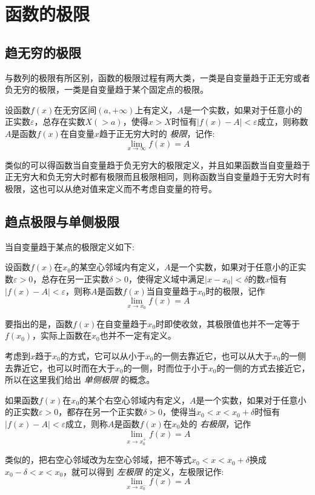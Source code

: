 
\section{函数的极限}
\label{sec:limit-of-function}

\subsection{趋无穷的极限}
\label{sec:limit-of-function-at-infinite-point}

与数列的极限有所区别，函数的极限过程有两大类，一类是自变量趋于正无穷或者负无穷的极限，一类是自变量趋于某个固定点的极限。

\begin{definition}
  设函数$f(x)$在无穷区间$(a,+\infty)$上有定义，$A$是一个实数，如果对于任意小的正实数$\varepsilon$，总存在实数$X(>a)$，使得$x>X$时恒有$|f(x)-A|<\varepsilon$成立，则称数$A$是函数$f(x)$在自变量$x$趋于正无穷大时的 \emph{极限}，记作:
  \[ \lim_{x\to\infty}f(x) = A \]
\end{definition}
类似的可以得函数当自变量趋于负无穷大的极限定义，并且如果函数当自变量趋于正无穷大和负无穷大时都有极限而且极限相同，则称函数当自变量趋于无穷大时有极限，这也可以从绝对值来定义而不考虑自变量的符号。


\subsection{趋点极限与单侧极限}
\label{sec:limit-of-function-at-point}

当自变量趋于某点的极限定义如下:
\begin{definition}
  设函数$f(x)$在$x_0$的某空心邻域内有定义，$A$是一个实数，如果对于任意小的正实数$\varepsilon>0$，总存在另一正实数$\delta>0$，使得定义域中满足$|x-x_0|<\delta$的数$x$恒有$|f(x)-A|<\varepsilon$，则称$A$是函数$f(x)$当自变量趋于$x_0$时的极限，记作
  \[ \lim_{x\to x_0} f(x) = A \]
\end{definition}
要指出的是，函数$f(x)$在自变量趋于$x_0$时即使收敛，其极限值也并不一定等于$f(x_0)$，实际上函数在$x_0$也并不一定有定义。

考虑到$x$趋于$x_0$的方式，它可以从小于$x_0$的一侧去靠近它，也可以从大于$x_0$的一侧去靠近它，也可以时而在大于$x_0$的一侧，时而位于小于$x_0$的一侧的方式去接近它，所以在这里我们给出 \emph{单侧极限} 的概念。

\begin{definition}
  如果函数$f(x)$在$x_0$的某个右空心邻域内有定义，$A$是一个实数，如果对于任意小的正实数$\varepsilon>0$，都存在另一个正实数$\delta>0$，使得当$x_0<x<x_0+\delta$时恒有$|f(x)-A|<\varepsilon$成立，则称$A$是函数$f(x)$在$x_0$处的 \emph{右极限}，记作
  \[ \lim_{x \to x_0^+} f(x) = A \]
\end{definition}
类似的，把右空心邻域改为左空心邻域，把不等式$x_0<x<x_0+\delta$换成$x_0-\delta<x<x_0$，就可以得到 \emph{左极限} 的定义，左极限记作:
  \[ \lim_{x \to x_0^-} f(x) = A \]

